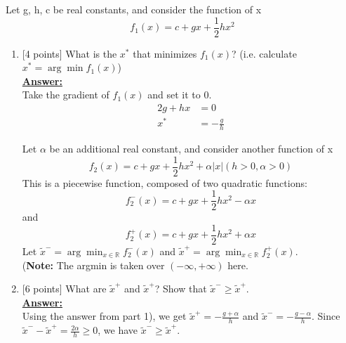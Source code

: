 \documentclass{article}
\newenvironment{qparts}{\begin{enumerate}[1.]}{\end{enumerate}}
\begin{document}
Let g, h, c be real constants, and consider the function of x
\begin{equation}
f_1(x) = c+gx+\frac{1}{2}hx^2
\end{equation}
\begin{qparts}
\item {[}4 points{]} 
What is the $x^*$ that minimizes $f_1(x)$? (i.e. calculate $x^*=\arg\min f_1(x)$)\\
\underline{\textbf{Answer:}}\\
Take the gradient of $f_1(x)$ and set it to 0.
\begin{alignat}{2}
g+hx&=0 \\
x^*&=-\frac{g}{h}
\end{alignat}   

Let $\alpha$ be an additional real constant, and consider another function of x
\begin{equation}\label{eq:hl1}
f_2(x) = c+gx+\frac{1}{2}hx^2+\alpha|x|(h>0, \alpha>0)
\end{equation}
This is a piecewise function, composed of two quadratic functions:
\begin{equation}
f_2^-(x) = c+gx+\frac{1}{2}hx^2-\alpha x
\end{equation}
and
\begin{equation}
f_2^+(x) = c+gx+\frac{1}{2}hx^2+\alpha x
\end{equation}
Let $\tilde{x}^-=\arg\min_{x\in\mathbb{R}}f_2^-(x)$ and $\tilde{x}^+=\arg\min_{x\in\mathbb{R}}f_2^+(x)$.\\
(\textbf{Note:} The argmin is taken over $(-\infty, +\infty)$ here.
\\

\item {[}6 points{]} 
What are $\tilde{x}^+$ and $\tilde{x}^+$? Show that $\tilde{x}^-\geq\tilde{x}^+$. \\
\underline{\textbf{Answer:}}\\
Using the answer from part 1), we get $\tilde{x}^+=-\frac{g+\alpha}{h}$ and $\tilde{x}^-=-\frac{g-\alpha}{h}$. Since $\tilde{x}^--\tilde{x}^+=\frac{2\alpha}{h}\geq 0$, we have $\tilde{x}^-\geq\tilde{x}^+$.



\end{qparts}
\end{document}

